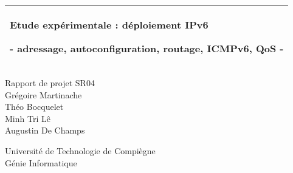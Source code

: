 %
%
%
%
%
\begin{titlepage}
  \addtolength{\hoffset}{0.5\evensidemargin-0.5\oddsidemargin} %
  \noindent%
  \begin{tabular}{@{}p{\textwidth}@{}}
    \toprule[2pt]
    \midrule
    \vspace{0.2cm}
    \begin{center}
    \Huge{\textbf{
      Etude expérimentale : déploiement IPv6%
    }}
    \end{center}
    \begin{center}
      \Large{
        - adressage, autoconfiguration, routage, ICMPv6, QoS -%
      }
    \end{center}
    \vspace{0.2cm}\\
    \midrule
    \toprule[2pt]
  \end{tabular}
  \vspace{4 cm}
  \begin{center}
    {\large
      Rapport de projet SR04%
    }\\
    \vspace{0.2cm}
    {\Large
      Grégoire Martinache\\
      Théo Bocquelet\\
      Minh Tri L\^{e}\\
      Augustin De Champs
    }
  \end{center}
  \vfill
  \begin{center}
  Université de Technologie de Compiègne\\
  Génie Informatique
  \end{center}
\end{titlepage}
\clearpage